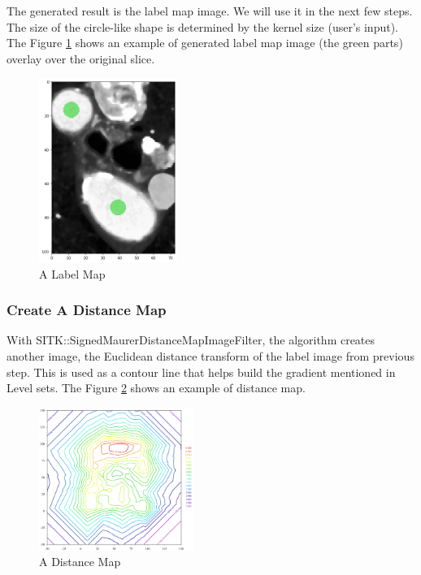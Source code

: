 The generated result is the label map image. We will use it in the next few steps. The size of the circle-like shape is determined by the kernel size (user's input). The Figure \ref{fig_label_map} shows an example of generated label map image (the green parts) overlay over the original slice.

\begin{figure}[H]
    \centering
    \includegraphics[width=0.4\textwidth]{figures/AGR/label_image.png}
    \caption[A label image]{A Label Map}
    \label{fig_label_map}
\end{figure}

\subsubsection{Create A Distance Map}\label{distance_map}
With SITK::SignedMaurerDistanceMapImageFilter, the algorithm creates another image, the Euclidean distance transform of the label image from previous step. This is used as a contour line that helps build the gradient mentioned in Level sets. The Figure \ref{fig_distance_map} shows an example of distance map.

\begin{figure}[H]
    \centering
    \includegraphics[width=0.45\textwidth]{figures/AGR/Contour2D.png}
    \caption[A Distance Map]{A Distance Map}
    \label{fig_distance_map}
\end{figure}

